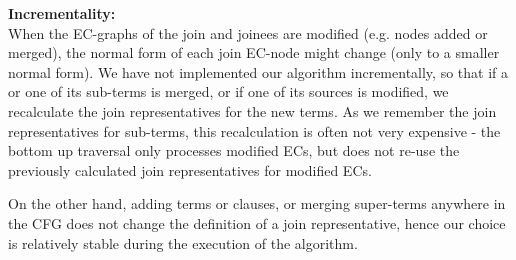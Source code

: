 \textbf{Incrementality:}\\
When the EC-graphs of the join and joinees are modified (e.g. nodes added or merged), the normal form of each join EC-node might change (only to a smaller normal form). We have not implemented our algorithm incrementally, so that if a \GT{} or one of its sub-terms is merged, or if one of its sources is modified, we recalculate the join representatives for the new terms. As we remember the join representatives for sub-terms, this recalculation is often not very expensive - the bottom up traversal only processes modified ECs, but does not re-use the previously calculated join representatives for modified ECs.

On the other hand, adding terms or clauses, or merging super-terms anywhere in the CFG does not change the definition of a join representative, hence our choice is relatively stable during the execution of the algorithm.
